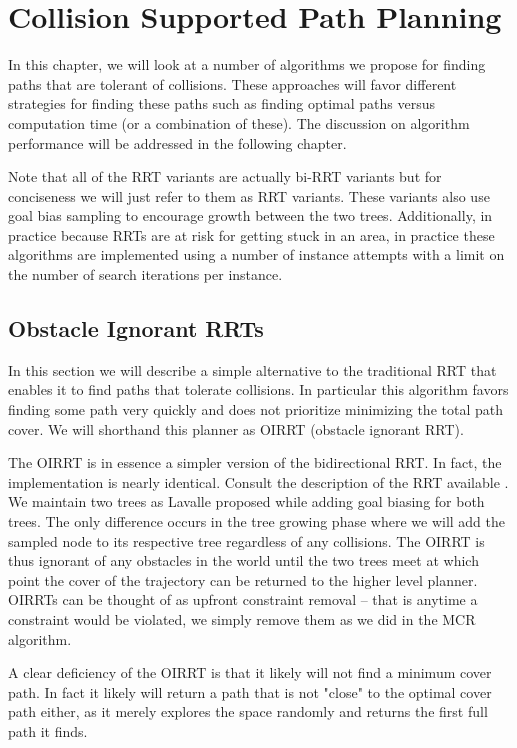 \chapter{Collision Supported Path Planning}
In this chapter, we will look at a number of algorithms we propose for finding paths that are tolerant of collisions. These approaches will favor different strategies for finding these paths such as finding optimal paths versus computation time (or a combination of these). The discussion on algorithm performance will be addressed in the following chapter.

Note that all of the RRT variants are actually bi-RRT variants but for conciseness we will just refer to them as RRT variants. These variants also use goal bias sampling to encourage growth between the two trees. Additionally, in practice because RRTs are at risk for getting stuck in an area, in practice these algorithms are implemented using a number of instance attempts with a limit on the number of search iterations per instance. 

\section{Obstacle Ignorant RRTs}
In this section we will describe a simple alternative to the traditional RRT that enables it to find paths that tolerate collisions. In particular this algorithm favors finding some path very quickly and does not prioritize minimizing the total path cover. We will shorthand this planner as OIRRT (obstacle ignorant RRT).

The OIRRT is in essence a simpler version of the bidirectional RRT. In fact, the implementation is nearly identical. Consult the description of the RRT available . We maintain two trees as Lavalle proposed while adding goal biasing for both trees. The only difference occurs in the tree growing phase where we will add the sampled node to its respective tree regardless of any collisions. The OIRRT is thus ignorant of any obstacles in the world until the two trees meet at which point the cover of the trajectory can be returned to the higher level planner. OIRRTs can be thought of as upfront constraint removal -- that is anytime a constraint would be violated, we simply remove them as we did in the MCR algorithm. 

A clear deficiency of the OIRRT is that it likely will not find a minimum cover path. In fact it likely will return a path that is not "close" to the optimal cover path either, as it merely explores the space randomly and returns the first full path it finds.

